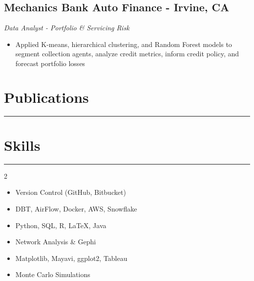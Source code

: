 \documentclass[11pt,a4paper]{article}
\newenvironment{myitemize}
{ \begin{itemize}[label={--}, leftmargin=*]
		\setlength{\itemsep}{0pt}
		\setlength{\parskip}{0pt}
		\setlength{\parsep}{0pt}     }
	{ \end{itemize}                  }
\begin{document}
	\subsection*{Mechanics Bank Auto Finance - Irvine, CA \hfill
					\vspace{-1mm} %
		  }
	\vspace{-1.5mm} %
	\textit{Data Analyst - Portfolio \& Servicing Risk}
	\vspace{-2.5mm} %
	\begin{myitemize}
		\item Applied K-means, hierarchical clustering, and Random Forest models to segment collection agents, analyze credit metrics, inform credit policy, and forecast portfolio losses
	\end{myitemize}
		\vspace{-8mm} %
	
	
	
	\section*{Publications}
	\vspace{-3mm} %
	
	\hrule
	\vspace{2mm} %
	
	
	
		\vspace{-10mm} %
	
	\section*{Skills}
	\vspace{-3mm} %
	\hrule
		\vspace{-3mm} %
	\begin{multicols}{2}
\begin{itemize}[noitemsep]
	\item Version Control (GitHub, Bitbucket)
	\item DBT, AirFlow, Docker, AWS, Snowflake
	\item Python, SQL, R, LaTeX, Java
	\item Network Analysis \& Gephi
	\item Matplotlib, Mayavi, ggplot2, Tableau
	\item Monte Carlo Simulations
\end{itemize}
		
	\end{multicols}
	
	
	
\end{document}
